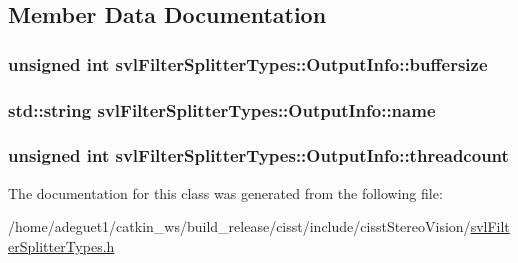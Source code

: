 \subsection{Member Data Documentation}
\hypertarget{classsvl_filter_splitter_types_1_1_output_info_ae339d93466ac94edf9c93da3242dd5f4}{
\subsubsection[{buffersize}]{\setlength{\rightskip}{0pt plus 5cm}unsigned int svl\-Filter\-Splitter\-Types\-::\-Output\-Info\-::buffersize}}\label{classsvl_filter_splitter_types_1_1_output_info_ae339d93466ac94edf9c93da3242dd5f4}
\hypertarget{classsvl_filter_splitter_types_1_1_output_info_a9d432e865089840e415764eba6b52129}{
\subsubsection[{name}]{\setlength{\rightskip}{0pt plus 5cm}std\-::string svl\-Filter\-Splitter\-Types\-::\-Output\-Info\-::name}}\label{classsvl_filter_splitter_types_1_1_output_info_a9d432e865089840e415764eba6b52129}
\hypertarget{classsvl_filter_splitter_types_1_1_output_info_a1829a482e318313cde1c6ef063912ada}{
\subsubsection[{threadcount}]{\setlength{\rightskip}{0pt plus 5cm}unsigned int svl\-Filter\-Splitter\-Types\-::\-Output\-Info\-::threadcount}}\label{classsvl_filter_splitter_types_1_1_output_info_a1829a482e318313cde1c6ef063912ada}


The documentation for this class was generated from the following file\-:\begin{DoxyCompactItemize}
\item 
/home/adeguet1/catkin\-\_\-ws/build\-\_\-release/cisst/include/cisst\-Stereo\-Vision/\hyperlink{svl_filter_splitter_types_8h}{svl\-Filter\-Splitter\-Types.\-h}\end{DoxyCompactItemize}
